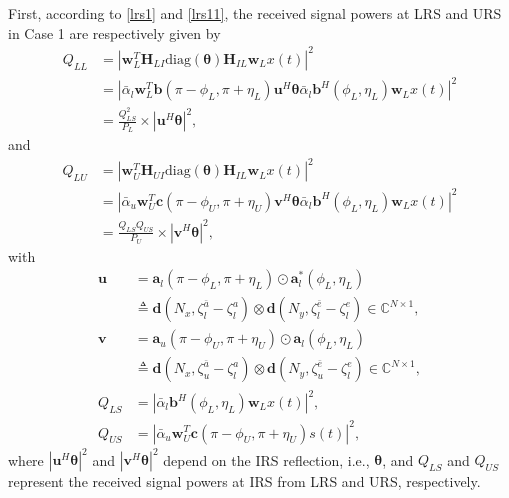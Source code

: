 \documentclass[10pt,final,doublecolumn]{IEEEtran}
\begin{document}
First, according to \eqref{lrs1} and \eqref{lrs11}, the received signal powers at LRS and URS in Case 1 are respectively given by
\begin{align}\label{qll}
{Q}_{LL}&={|\mathbf{w}_{{L}}^T\mathbf{H}_{LI}
\text{diag}(\boldsymbol{\theta})\mathbf{H}_{IL}\mathbf{w}_{{L}}x(t)|^2}\nonumber\\
&={|\bar{\alpha}_l\mathbf{w}_{{L}}^T\mathbf{b}(\pi-{\phi}_{{L}},\pi+{\eta}_{{L}})
{\mathbf{u}}^H
\boldsymbol{\theta}\bar{\alpha}_l
\mathbf{b}^H({\phi}_{{L}},{\eta}_{{L}})\mathbf{w}_{{L}}x(t)|^2}\nonumber\\
&={\frac{Q_{LS}^2}{P_L}\times|{\mathbf{u}}^H
\boldsymbol{\theta}|^2},
\end{align}
and
\begin{align}\label{qlu}
{Q}_{LU}&={|\mathbf{w}_{{U}}^T\mathbf{H}_{UI}\text{diag}(\boldsymbol{\theta})\mathbf{H}_{IL}
\mathbf{w}_{{L}}x(t)|^2}\nonumber\\
&={|\bar{\alpha}_u\mathbf{w}_{{U}}^T\mathbf{c}(\pi-{\phi}_{{U}},\pi+{\eta}_{{U}}){\mathbf{v}}^H
\boldsymbol{\theta}\bar{\alpha}_l\mathbf{b}^H({\phi}_{{L}},{\eta}_{{L}})
\mathbf{w}_{{L}}x(t)|^2}\nonumber\\
&={\frac{Q_{LS}Q_{US}}{P_U}\times|{\mathbf{v}}^H
\boldsymbol{\theta}|^2},
\end{align}
with
\begin{align}
{\mathbf{u}}&=\mathbf{a}_l(\pi-{\phi}_{{L}},\pi+{\eta}_{{L}})\odot \mathbf{a}_l^*({\phi}_{{L}},{\eta}_{{L}})\nonumber\\
&\triangleq \mathbf{d}(N_x,\zeta_l^{\bar{a}}-\zeta_l^{a}) \otimes \mathbf{d}(N_y,\zeta_l^{\bar{e}}-\zeta_l^{e})\in \mathbb{C}^{N\times 1},\label{uo}\\
{\mathbf{v}}&=\mathbf{a}_u(\pi-{\phi}_{{U}},\pi+{\eta}_{{U}})\odot \mathbf{a}_l({\phi}_{{L}},{\eta}_{{L}}) \nonumber\\ &\triangleq \mathbf{d}(N_x,\zeta_u^{\bar{a}}-\zeta_l^{a}) \otimes \mathbf{d}(N_y,\zeta_u^{\bar{e}}-\zeta_l^{e})\in \mathbb{C}^{N\times 1}, \label{vo}\\
Q_{LS}&=|\bar{\alpha}_l
\mathbf{b}^H({\phi}_{{L}},{\eta}_{{L}})\mathbf{w}_{{L}}x(t)|^2,\label{PLI}\\
Q_{US}&=|\bar{\alpha}_u\mathbf{w}_{{U}}^T\mathbf{c}(\pi-{\phi}_{{U}},\pi+{\eta}_{{U}})s(t)|^2,\label{PUI}
\end{align}
where $|{\mathbf{u}}^H \boldsymbol{\theta}|^2$ and $|{\mathbf{v}}^H \boldsymbol{\theta}|^2$ depend on the IRS reflection, i.e., $\boldsymbol{\theta}$, and $Q_{LS}$ and $Q_{US}$ represent the received signal powers at IRS from LRS and URS, respectively.
\end{document}
